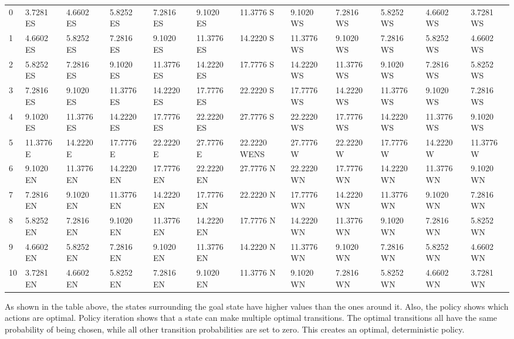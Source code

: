 \documentclass{article}
\begin{document}
\begin{center}
{\begin{tabular}{ |l | l | l | l | l | l | l | l | l | l | l | l|}
\hline
0 & 3.7281  ES &  4.6602  ES &  5.8252  ES &  7.2816  ES &  9.1020  ES &  11.3776  S &  9.1020  WS &  7.2816  WS &  5.8252  WS &  4.6602  WS &  3.7281  WS  \\
1 & 4.6602  ES &  5.8252  ES &  7.2816  ES &  9.1020  ES &  11.3776  ES &  14.2220  S &  11.3776  WS &  9.1020  WS &  7.2816  WS &  5.8252  WS &  4.6602  WS  \\
2 & 5.8252  ES &  7.2816  ES &  9.1020  ES &  11.3776  ES &  14.2220  ES &  17.7776  S &  14.2220  WS &  11.3776  WS &  9.1020  WS &  7.2816  WS &  5.8252  WS  \\
3 & 7.2816  ES &  9.1020  ES &  11.3776  ES &  14.2220  ES &  17.7776  ES &  22.2220  S &  17.7776  WS &  14.2220  WS &  11.3776  WS &  9.1020  WS &  7.2816  WS  \\
4 & 9.1020  ES &  11.3776  ES &  14.2220  ES &  17.7776  ES &  22.2220  ES &  27.7776  S &  22.2220  WS &  17.7776  WS &  14.2220  WS &  11.3776  WS &  9.1020  WS  \\
5 & 11.3776  E &  14.2220  E &  17.7776  E &  22.2220  E &  27.7776  E &  \cellcolor{red!40}22.2220  WENS &  27.7776  W &  22.2220  W &  17.7776  W &  14.2220  W &  11.3776  W  \\
6 & 9.1020  EN &  11.3776  EN &  14.2220  EN &  17.7776  EN &  22.2220  EN &  27.7776  N &  22.2220  WN &  17.7776  WN &  14.2220  WN &  11.3776  WN &  9.1020  WN  \\
7 & 7.2816  EN &  9.1020  EN &  11.3776  EN &  14.2220  EN &  17.7776  EN &  22.2220  N &  17.7776  WN &  14.2220  WN &  11.3776  WN &  9.1020  WN &  7.2816  WN  \\
8 & 5.8252  EN &  7.2816  EN &  9.1020  EN &  11.3776  EN &  14.2220  EN &  17.7776  N &  14.2220  WN &  11.3776  WN &  9.1020  WN &  7.2816  WN &  5.8252  WN  \\
9 & 4.6602  EN &  5.8252  EN &  7.2816  EN &  9.1020  EN &  11.3776  EN &  14.2220  N &  11.3776  WN &  9.1020  WN &  7.2816  WN &  5.8252  WN &  4.6602  WN  \\
10 & 3.7281  EN &  4.6602  EN &  5.8252  EN &  7.2816  EN &  9.1020  EN &  11.3776  N &  9.1020  WN &  7.2816  WN &  5.8252  WN &  4.6602  WN &  3.7281  WN  \\
\hline
	\end{tabular}
	}
\end{center}

As shown in the table above, the states surrounding the goal state have higher values than the ones around it. Also, the policy shows which actions are optimal. Policy iteration shows that a state can make multiple optimal transitions. The optimal transitions all have the same probability of being chosen, while all other transition probabilities are set to zero. This creates an optimal, deterministic policy.
\end{document}
